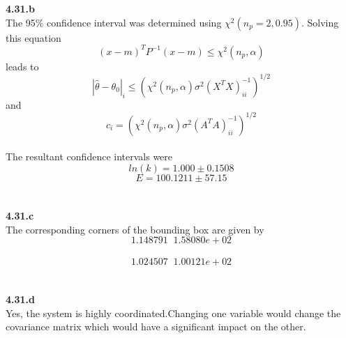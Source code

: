 \documentclass[10pt]{article}
\begin{document}
{\bf 4.31.b} \\
The 95$\%$ confidence interval was determined using $\chi^2(n_p=2,0.95)$. 
Solving this equation
\[ (x-m)^TP^{-1}(x-m) \leq \chi^2(n_p,\alpha) \]
leads to 
\[ |{\hat \theta}-\theta_0|_i \leq \left( \chi^2(n_p,\alpha)\sigma^2(X^TX)_{ii}^{-1}  \right)^{1/2} \]
and
\[ c_i=(\chi^2(n_p,\alpha)\sigma^2(A^TA)^{-1}_{ii})^{1/2} \]
\\
The resultant confidence intervals were
\[ ln(k)=1.000 \pm 0.1508\]
\[ E=100.1211 \pm 57.15\]
\\
\\
{\bf 4.31.c} \\
The corresponding corners of the bounding box are given by\\
\[1.148791 \;\; 1.58080e+02\] \\
\[1.024507 \;\; 1.00121e+02\] \\
\\
{\bf 4.31.d} 
\\
Yes, the system is highly coordinated.Changing one variable would change the covariance matrix which would have a significant impact on the other. 
\end{document}
